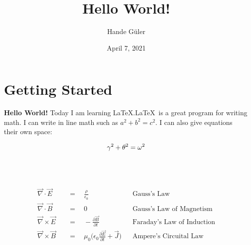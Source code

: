 \documentclass{article}
\title{Hello World!}
\author{Hande Güler}
\date{April 7, 2021}
\begin{document}
\maketitle

\section{Getting Started}

\textbf{Hello World!}  Today I am learning \LaTeX.\LaTeX\ is a great program for writing math. I can write in line math such as $a^2 + b^2 = c^2$. I can also give equations their own space:

\begin{align}
    \gamma^2 + \theta^2 = \omega^2 \\[\baselineskip]
    \nonumber
\end{align}
\\
\begin{align}
    \Vec{\nabla}\cdot\Vec{E} \quad& = \quad \frac{\rho}{\epsilon_0}&&\text{Gauss's Law} \\
    \Vec{\nabla}\cdot\Vec{B}\quad& =\quad 0 &&  \text{Gauss's Law of Magnetism} \\
    \Vec{\nabla} \times \Vec{E}\quad& =\quad -\frac{\partial\Vec{B}}{\partial{t}} && \text{Faraday's Law of Induction} \\
    \Vec{\nabla} \times  \Vec{B}\quad& = \quad \mu_0    \bigg(\epsilon_0\frac{\partial\Vec{E}}{\partial{t}} + \Vec{J}\bigg) && \text{Ampere's Circuital Law}
\end{align}    
\end{document}
